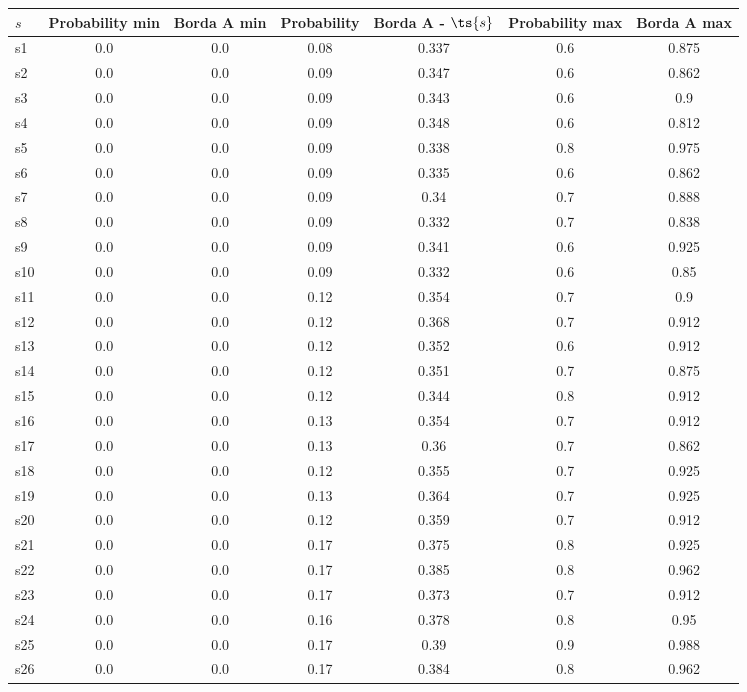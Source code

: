 \documentclass{article}
\begin{document}
\noindent\begin{tabular}{|l|c|c|c|c|c|c|}
\hline
$s$& Probability min & Borda A min & Probability & Borda A - $\ts{s}$ & Probability max & Borda A max\\
\hline
s1 &0.0 & 0.0 & 0.08 & 0.337 & 0.6 & 0.875\\
\hline
s2 &0.0 & 0.0 & 0.09 & 0.347 & 0.6 & 0.862\\
\hline
s3 &0.0 & 0.0 & 0.09 & 0.343 & 0.6 & 0.9\\
\hline
s4 &0.0 & 0.0 & 0.09 & 0.348 & 0.6 & 0.812\\
\hline
s5 &0.0 & 0.0 & 0.09 & 0.338 & 0.8 & 0.975\\
\hline
s6 &0.0 & 0.0 & 0.09 & 0.335 & 0.6 & 0.862\\
\hline
s7 &0.0 & 0.0 & 0.09 & 0.34 & 0.7 & 0.888\\
\hline
s8 &0.0 & 0.0 & 0.09 & 0.332 & 0.7 & 0.838\\
\hline
s9 &0.0 & 0.0 & 0.09 & 0.341 & 0.6 & 0.925\\
\hline
s10 &0.0 & 0.0 & 0.09 & 0.332 & 0.6 & 0.85\\
\hline
s11 &0.0 & 0.0 & 0.12 & 0.354 & 0.7 & 0.9\\
\hline
s12 &0.0 & 0.0 & 0.12 & 0.368 & 0.7 & 0.912\\
\hline
s13 &0.0 & 0.0 & 0.12 & 0.352 & 0.6 & 0.912\\
\hline
s14 &0.0 & 0.0 & 0.12 & 0.351 & 0.7 & 0.875\\
\hline
s15 &0.0 & 0.0 & 0.12 & 0.344 & 0.8 & 0.912\\
\hline
s16 &0.0 & 0.0 & 0.13 & 0.354 & 0.7 & 0.912\\
\hline
s17 &0.0 & 0.0 & 0.13 & 0.36 & 0.7 & 0.862\\
\hline
s18 &0.0 & 0.0 & 0.12 & 0.355 & 0.7 & 0.925\\
\hline
s19 &0.0 & 0.0 & 0.13 & 0.364 & 0.7 & 0.925\\
\hline
s20 &0.0 & 0.0 & 0.12 & 0.359 & 0.7 & 0.912\\
\hline
s21 &0.0 & 0.0 & 0.17 & 0.375 & 0.8 & 0.925\\
\hline
s22 &0.0 & 0.0 & 0.17 & 0.385 & 0.8 & 0.962\\
\hline
s23 &0.0 & 0.0 & 0.17 & 0.373 & 0.7 & 0.912\\
\hline
s24 &0.0 & 0.0 & 0.16 & 0.378 & 0.8 & 0.95\\
\hline
s25 &0.0 & 0.0 & 0.17 & 0.39 & 0.9 & 0.988\\
\hline
s26 &0.0 & 0.0 & 0.17 & 0.384 & 0.8 & 0.962\\

\end{tabular}
\end{document}
